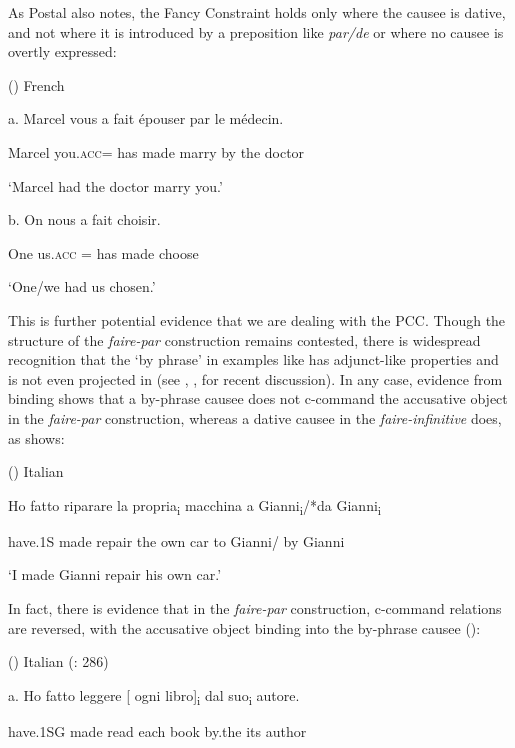 \documentclass[output=paper,modfonts,nonflat]{langsci/langscibook}
\begin{document}
As Postal also notes, the Fancy Constraint holds only where the causee is dative, and not where it is introduced by a preposition like \textit{par/de} or where no causee is overtly expressed:

()  French \citep[3]{Postal1989}

  a.   Marcel vous     a  fait   épouser   par   le   médecin.

    Marcel you.\textsc{acc}=  has  made   marry   by   the   doctor

    ‘Marcel had the doctor marry you.’

b.   On  nous     a   fait choisir.

    One   us.\textsc{acc}  =  has   made choose

    ‘One/we had us chosen.’

This is further potential evidence that we are dealing with the PCC. Though the structure of the \textit{faire-par} construction remains contested, there is widespread recognition that the ‘by phrase’ in examples like  has adjunct-like properties and is not even projected in  (see \citealt{Guasti1996}, \citealt{FolliHarley2007}, \citealt{SheehanCyrino2016} for recent discussion). In any case, evidence from binding shows that a by-phrase causee does not c-command the accusative object in the \textit{faire-par} construction, whereas a dative causee in the \textit{faire-infinitive} does, as \citet{Burzio1986} shows:

()  Italian \citep{Burzio1986} 

Ho   fatto   riparare   la   propria\textsubscript{i} macchina  a  Gianni\textsubscript{i}/*da   Gianni\textsubscript{i}

have.1S   made   repair   the  own   car   to   Gianni/  by   Gianni

‘I made Gianni repair his own car.’

In fact, there is evidence that in the \textit{faire-par} construction, c-command relations are reversed, with the accusative object binding into the by-phrase causee (\citealt{SheehanCyrino2016}):

()  Italian (\citealt{SheehanCyrino2016}: 286)

a.   Ho   fatto   leggere [  ogni   libro]\textsubscript{i} dal   suo\textsubscript{i}   autore. 

  have.1SG   made   read   each book   by.the   its   author  
\end{document}

